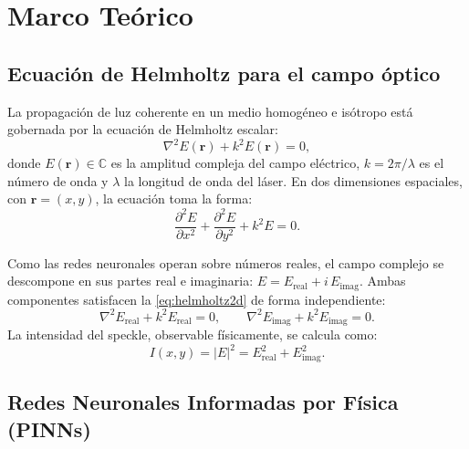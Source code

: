 
\section{Marco Teórico}
\label{sec:teoria}

\subsection{Ecuación de Helmholtz para el campo óptico}
\label{subsec:helmholtz}

La propagación de luz coherente en un medio homogéneo e isótropo está gobernada
por la ecuación de Helmholtz escalar:
%
\begin{equation}
  \nabla^2 E(\mathbf{r}) + k^2 E(\mathbf{r}) = 0,
  \label{eq:helmholtz}
\end{equation}
%
donde $E(\mathbf{r}) \in \mathbb{C}$ es la amplitud compleja del campo eléctrico,
$k = 2\pi/\lambda$ es el número de onda y $\lambda$ la longitud de onda del láser.
En dos dimensiones espaciales, con $\mathbf{r} = (x, y)$, la ecuación toma la forma:
%
\begin{equation}
  \frac{\partial^2 E}{\partial x^2} + \frac{\partial^2 E}{\partial y^2} + k^2 E = 0.
  \label{eq:helmholtz2d}
\end{equation}

Como las redes neuronales operan sobre números reales, el campo complejo se descompone
en sus partes real e imaginaria: $E = E_{\mathrm{real}} + i\,E_{\mathrm{imag}}$.
Ambas componentes satisfacen la \cref{eq:helmholtz2d} de forma independiente:
%
\begin{equation}
  \nabla^2 E_{\mathrm{real}} + k^2 E_{\mathrm{real}} = 0, \qquad
  \nabla^2 E_{\mathrm{imag}} + k^2 E_{\mathrm{imag}} = 0.
  \label{eq:helmholtz_split}
\end{equation}
%
La intensidad del speckle, observable físicamente, se calcula como:
%
\begin{equation}
  I(x,y) = |E|^2 = E_{\mathrm{real}}^2 + E_{\mathrm{imag}}^2.
  \label{eq:intensidad}
\end{equation}

\subsection{Redes Neuronales Informadas por Física (PINNs)}
\label{subsec:pinns}

